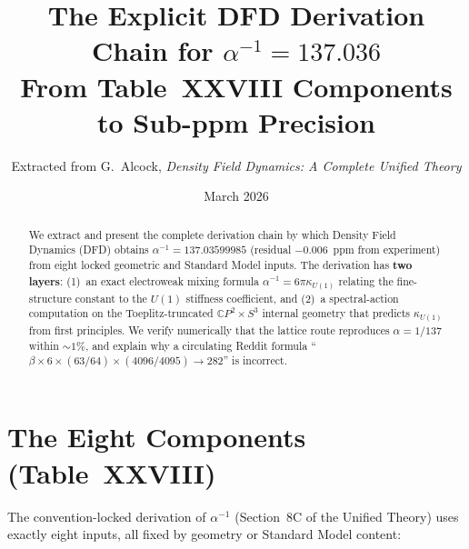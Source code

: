 \documentclass[12pt,a4paper]{article}
\title{The Explicit DFD Derivation Chain for $\alpha^{-1} = 137.036$\\[6pt]
\large From Table~XXVIII Components to Sub-ppm Precision}
\author{Extracted from G.\ Alcock, \textit{Density Field Dynamics: A Complete Unified Theory}}
\date{March 2026}
\begin{document}
\maketitle

\begin{abstract}
We extract and present the complete derivation chain by which Density Field
Dynamics (DFD) obtains $\alpha^{-1} = 137.03599985$ (residual $-0.006$~ppm
from experiment) from eight locked geometric and Standard Model inputs.
The derivation has \textbf{two layers}: (1)~an exact electroweak mixing
formula $\alpha^{-1} = 6\pi\kappa_{U(1)}$ relating the fine-structure
constant to the $U(1)$ stiffness coefficient, and (2)~a spectral-action
computation on the Toeplitz-truncated $\mathbb{C}P^2 \times S^3$ internal
geometry that predicts $\kappa_{U(1)}$ from first principles.
We verify numerically that the lattice route reproduces $\alpha = 1/137$
within $\sim 1\%$, and explain why a circulating Reddit formula
``$\beta \times 6 \times (63/64) \times (4096/4095) \to 282$'' is incorrect.
\end{abstract}

\tableofcontents
\newpage

\section{The Eight Components (Table~XXVIII)}
\label{sec:components}

The convention-locked derivation of $\alpha^{-1}$ (Section~8C of the Unified
Theory) uses exactly eight inputs, all fixed by geometry or Standard Model
content:
\end{document}
